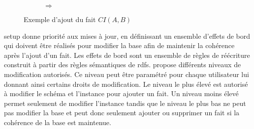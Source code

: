 \begin{figure}[htb]
    \centering
    \begin{subfigure}{.4\textwidth}
        \centering
        \begin{adjustbox}{valign=c, max width=\textwidth}
        \end{adjustbox}
    \end{subfigure}
    \hfill
    \begin{subfigure}{.1\textwidth}
        \centering
        \huge{$\Longrightarrow$}
    \end{subfigure}
    \hfill
    \begin{subfigure}{.4\textwidth}
        \centering
        \begin{adjustbox}{valign=c, max width=\textwidth}
        \end{adjustbox}
    \end{subfigure}
    \caption{Exemple d'ajout du fait $CI(A,B)$}
    \label{fig:rule_ci}
\end{figure}

\gls{setup} donne priorité aux mises à jour, en définissant un ensemble d'effets de bord qui doivent être réalisés pour modifier la base afin de maintenir la cohérence après l'ajout d'un fait.
Les effets de bord sont un ensemble de règles de réécriture construit à partir des règles sémantiques de \gls{rdfs}.
\cite{chabinUsingGraphGrammar2019} propose différents niveaux de modification autorisés.
Ce niveau peut être paramétré pour chaque utilisateur lui donnant ainsi certains droits de modification.
Le niveau le plus élevé est autorisé à modifier le schéma et l'instance pour ajouter un fait.
Un niveau moins élevé permet seulement de modifier l'instance tandis que le niveau le plus bas ne peut pas modifier la base et peut donc seulement ajouter ou supprimer un fait si la cohérence de la base est maintenue.


